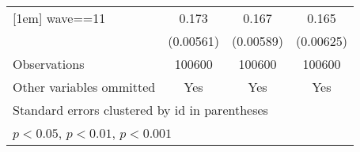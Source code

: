 {\begin{tabular}{l*{3}{c}}
[1em]
wave==11            &       0.173\sym{***}&       0.167\sym{***}&       0.165\sym{***}\\
                    &   (0.00561)         &   (0.00589)         &   (0.00625)         \\
\hline
Observations        &      100600         &      100600         &      100600         \\
Other variables ommitted&         Yes         &         Yes         &         Yes         \\
\hline\hline
\multicolumn{4}{l}{\footnotesize \footnotesize Standard errors clustered by id in parentheses}\\
\multicolumn{4}{l}{\footnotesize \footnotesize \sym{*} \(p<0.05\), \sym{**} \(p<0.01\), \sym{***} \(p<0.001\)}\\
\end{tabular}
}
